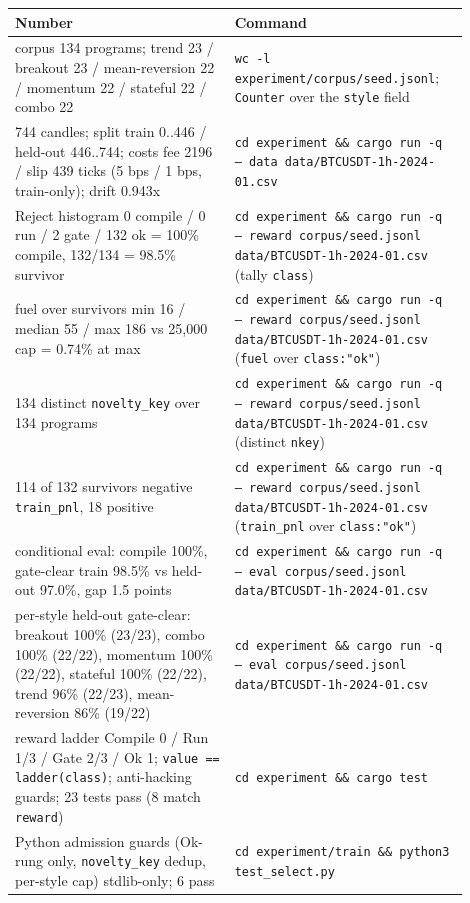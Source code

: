 \documentclass[11pt]{article}
\newcommand{\code}[1]{\texttt{#1}}
\begin{document}
\begingroup\small
\begin{longtable}{p{0.450\linewidth} p{0.450\linewidth}}
\toprule
\textbf{Number} & \textbf{Command} \\
\midrule\endhead
corpus 134 programs; trend 23 / breakout 23 / mean-reversion 22 / momentum 22 / stateful 22 / combo 22 & \code{wc -l experiment/corpus/seed.jsonl}; \code{Counter} over the \code{style} field \\
744 candles; split train 0..446 / held-out 446..744; costs fee 2196 / slip 439 ticks (5 bps / 1 bps, train-only); drift 0.943x & \code{cd experiment \&\& cargo run -q -- data data/BTCUSDT-1h-2024-01.csv} \\
Reject histogram 0 compile / 0 run / 2 gate / 132 ok = 100\% compile, 132/134 = 98.5\% survivor & \code{cd experiment \&\& cargo run -q -- reward corpus/seed.jsonl data/BTCUSDT-1h-2024-01.csv} (tally \code{class}) \\
fuel over survivors min 16 / median 55 / max 186 vs 25,000 cap = 0.74\% at max & \code{cd experiment \&\& cargo run -q -- reward corpus/seed.jsonl data/BTCUSDT-1h-2024-01.csv} (\code{fuel} over \code{class:"ok"}) \\
134 distinct \code{novelty\_key} over 134 programs & \code{cd experiment \&\& cargo run -q -- reward corpus/seed.jsonl data/BTCUSDT-1h-2024-01.csv} (distinct \code{nkey}) \\
114 of 132 survivors negative \code{train\_pnl}, 18 positive & \code{cd experiment \&\& cargo run -q -- reward corpus/seed.jsonl data/BTCUSDT-1h-2024-01.csv} (\code{train\_pnl} over \code{class:"ok"}) \\
conditional eval: compile 100\%, gate-clear train 98.5\% vs held-out 97.0\%, gap 1.5 points & \code{cd experiment \&\& cargo run -q -- eval corpus/seed.jsonl data/BTCUSDT-1h-2024-01.csv} \\
per-style held-out gate-clear: breakout 100\% (23/23), combo 100\% (22/22), momentum 100\% (22/22), stateful 100\% (22/22), trend 96\% (22/23), mean-reversion 86\% (19/22) & \code{cd experiment \&\& cargo run -q -- eval corpus/seed.jsonl data/BTCUSDT-1h-2024-01.csv} \\
reward ladder Compile 0 / Run 1/3 / Gate 2/3 / Ok 1; \code{value == ladder(class)}; anti-hacking guards; 23 tests pass (8 match \code{reward}) & \code{cd experiment \&\& cargo test} \\
Python admission guards (Ok-rung only, \code{novelty\_key} dedup, per-style cap) stdlib-only; 6 pass & \code{cd experiment/train \&\& python3 test\_select.py} \\
\bottomrule
\end{longtable}\endgroup
\end{document}
